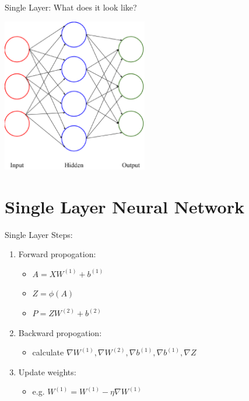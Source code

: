 \documentclass{beamer}
\begin{document}
  \begin{frame}{Single Layer: What does it look like?}
    \begin{center}
      \includegraphics[width=2.5in]{../figures/neural_network.eps}
    \end{center}
  \end{frame}

  \section{Single Layer Neural Network}
  \begin{frame}{Single Layer}
    Steps:
    \begin{enumerate}
      \item Forward propogation:
      \begin{itemize}
        \item $ A = XW^{(1)} + b^{(1)} $
        \item $ Z = \phi(A) $
        \item $ P = ZW^{(2)} + b^{(2)} $
      \end{itemize}

      \item Backward propogation:
      \begin{itemize}
        \item calculate $\nabla W^{(1)}, \nabla W^{(2)}, \nabla b^{(1)},
              \nabla b^{(1)}, \nabla Z$
      \end{itemize}

      \item Update weights:
      \begin{itemize}
        \item e.g. $W^{(1)} = W^{(1)} - \eta \nabla W^{(1)}$
      \end{itemize}
    \end{enumerate}
  \end{frame}
\end{document}

